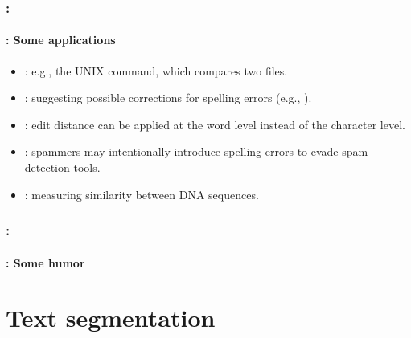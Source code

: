 \documentclass[xcolor=table]{beamer}
\begin{document}
\begin{frame}
	\frametitle{\insertshortsubtitle: \insertsection}
	\framesubtitle{\insertsubsection: Some applications}
	
	\begin{itemize}
		\item {}: e.g., the UNIX  command, which compares two files.
		\item {}: suggesting possible corrections for spelling errors (e.g., ).
		\item {}: edit distance can be applied at the word level instead of the character level.
		\item {}: spammers may intentionally introduce spelling errors to evade spam detection tools.
		\item {}: measuring similarity between DNA sequences.
	\end{itemize}
	
\end{frame}

\begin{frame}
	\frametitle{\insertshortsubtitle: \insertsection}
	\framesubtitle{\insertsubsection: Some humor}

	\begin{center}
	\end{center}

\end{frame}

\section{Text segmentation}
\end{document}
